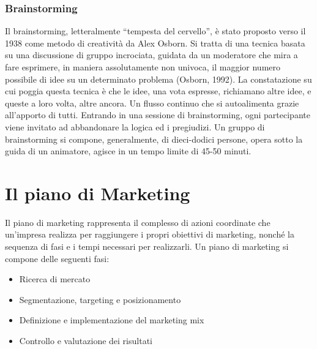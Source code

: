 \subsubsection*{Brainstorming}
Il brainstorming, letteralmente “tempesta del cervello”, è stato proposto verso il 1938 come metodo di creatività da Alex Osborn. Si tratta di una tecnica basata su una discussione di gruppo incrociata, guidata da un moderatore che mira a fare esprimere, in maniera assolutamente non univoca, il maggior numero possibile di idee su un determinato problema (Osborn, 1992). \newline
La constatazione su cui poggia questa tecnica è che le idee, una vota espresse, richiamano altre idee, e queste a loro volta, altre ancora. Un flusso continuo che si autoalimenta grazie all’apporto di tutti. Entrando in una sessione di brainstorming, ogni partecipante viene invitato ad abbandonare la logica ed i pregiudizi. Un gruppo di brainstorming si compone, generalmente, di dieci-dodici persone, opera sotto la guida di un animatore, agisce in un tempo limite di 45-50 minuti.

\section{Il piano di Marketing}
Il piano di marketing rappresenta il complesso di azioni coordinate che un’impresa realizza per raggiungere i propri obiettivi di marketing, nonché la sequenza di fasi e i tempi necessari per realizzarli. \newline
Un piano di marketing si compone delle seguenti fasi:
\begin{itemize}  
	\item Ricerca di mercato
	\item Segmentazione, targeting e posizionamento 
	\item Definizione e implementazione del marketing mix
	\item Controllo e valutazione dei risultati
\end{itemize}

